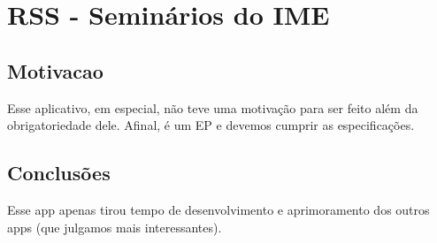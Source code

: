 \section{RSS - Seminários do IME}

\subsection{Motivacao}
Esse aplicativo, em especial, não teve uma motivação para ser feito além
da obrigatoriedade dele. Afinal, é um EP e devemos cumprir as
especificações.

\subsection{Conclusões}
Esse app apenas tirou tempo de desenvolvimento e aprimoramento dos outros
apps (que julgamos mais interessantes).
